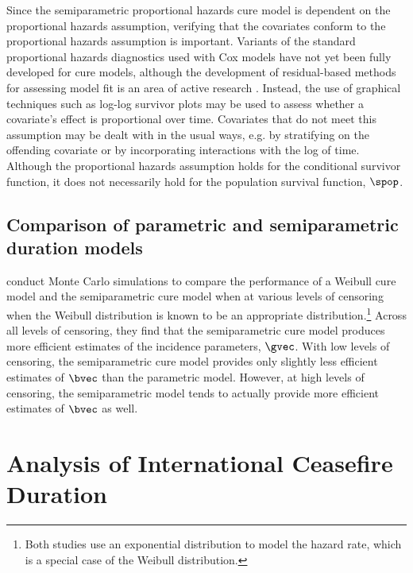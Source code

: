 \documentclass{article}
\begin{document}
Since the semiparametric proportional hazards cure model is dependent on the proportional hazards assumption, verifying that the covariates conform to the proportional hazards assumption is important. 
Variants of the standard proportional hazards diagnostics used with Cox models have not yet been fully developed for cure models, although the development of residual-based methods for assessing model fit is an area of active research \citep{peng2017, ramires2018}. Instead, the use of graphical techniques such as log-log survivor plots may be used to assess whether a covariate's effect is proportional over time. Covariates that do not meet this assumption may be dealt with in the usual ways, e.g. by stratifying on the offending covariate or by incorporating interactions with the log of time. Although the proportional hazards assumption holds for the conditional survivor function, it does not necessarily hold for the population survival function, $\spop$.

\subsection{Comparison of parametric and semiparametric duration models}
\citet{kuk1992, sy2000} conduct Monte Carlo simulations to compare the performance of a Weibull cure model and the semiparametric cure model when at various levels of censoring when the Weibull distribution is known to be an appropriate distribution.\footnote{Both studies use an exponential distribution to model the hazard rate, which is a special case of the Weibull distribution.} Across all levels of censoring, they find that the semiparametric cure model produces more efficient estimates of the incidence parameters, $\gvec$. With low levels of censoring, the semiparametric cure model provides only slightly less efficient estimates of $\bvec$ than the parametric model. However, at high levels of censoring, the semiparametric model tends to actually provide more efficient estimates of $\bvec$ as well.



\section{Analysis of International Ceasefire Duration}
\end{document}
